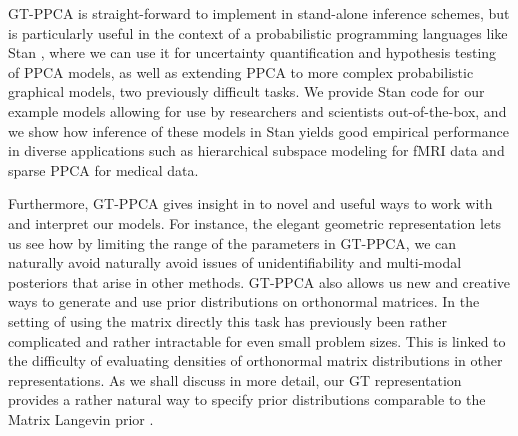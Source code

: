 \documentclass{article}
\begin{document}
GT-PPCA is straight-forward to implement in stand-alone inference schemes, but is particularly useful in the context of a probabilistic programming languages like Stan \citep{carpenter2016stan}, where we can use it for uncertainty quantification and hypothesis testing of PPCA models, as well as extending PPCA to more complex probabilistic graphical models, two previously difficult tasks. We provide Stan code for our example models allowing for use by researchers and scientists out-of-the-box, and we show how inference of these models in Stan yields good empirical performance in diverse applications such as hierarchical subspace modeling for fMRI data and sparse PPCA for medical data.

Furthermore, GT-PPCA gives insight in to novel and useful ways to work with and interpret our models.  For instance, the elegant geometric representation lets us see how by limiting the range of the parameters in GT-PPCA, we can naturally avoid naturally avoid issues of unidentifiability and multi-modal posteriors that arise in other methods.  GT-PPCA also allows us new and creative ways to generate and use prior distributions on orthonormal matrices.  In the setting of using the matrix directly this task has previously been rather complicated and rather intractable for even small problem sizes.  This is linked to the difficulty of evaluating densities of orthonormal matrix distributions in other representations.  As we shall discuss in more detail, our GT representation provides a rather natural way to specify prior distributions comparable to the Matrix Langevin prior \citep{muirhead2009aspects}.
\end{document}
